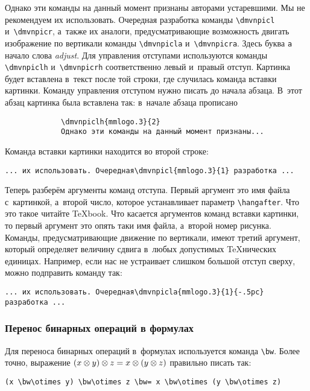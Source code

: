 \documentclass[a4paper]{article}
\begin{document}
Однако эти команды на данный момент признаны авторами устаревшими. Мы не рекомендуем
их использовать. Очередная разработка команды \verb'\dmvnpicl' и~\verb'\dmvnpicr',
а~также их аналоги, предусматривающие возможность двигать изображение по вертикали
команды \verb'\dmvnpicla' и~\verb'\dmvnpicra'. Здесь буква \verb'a' начало слова \emph{adjust}.
Для управления отступами используются команды \verb'\dmvnpiclh' и~\verb'\dmvnpicrh' соответственно
левый и~правый отступ. Картинка будет вставлена в~текст после той строки, где случилась
команда вставки картинки. Команду управления отступом нужно писать до начала абзаца.
В~этот абзац картинка была вставлена так: в~начале абзаца прописано
\begin{verbatim}
             \dmvnpiclh{mmlogo.3}{2}
             Однако эти команды на данный момент признаны...
\end{verbatim}
Команда вставки картинки находится во второй строке:
\begin{verbatim}
... их использовать. Очередная\dmvnpicl{mmlogo.3}{1} разработка ...
\end{verbatim}

Теперь разберём аргументы команд отступа. Первый аргумент это имя файла с~картинкой,
а~второй число, которое устанавливает параметр \verb'\hangafter'. Что это такое читайте
\TeX book. Что касается аргументов команд вставки картинки, то первый аргумент это опять таки
имя файла, а~второй номер рисунка. Команды, предусматривающие движение по вертикали,
имеют третий аргумент, который определяет величину сдвига в~любых допустимых \TeX нических единицах.
Например, если нас не устраивает слишком большой отступ сверху, можно подправить команду так:
\begin{verbatim}
... их использовать. Очередная\dmvnpicla{mmlogo.3}{1}{-.5pc} разработка ...
\end{verbatim}

\subsubsection{Перенос бинарных операций в формулах}
Для переноса бинарных операций в~формулах используется команда \verb'\bw'.
Более точно, выражение $(x \bw\otimes y) \bw\otimes z \bw= x \bw\otimes (y \bw\otimes z)$ правильно писать так:
\begin{verbatim}
(x \bw\otimes y) \bw\otimes z \bw= x \bw\otimes (y \bw\otimes z)
\end{verbatim}
\end{document}
